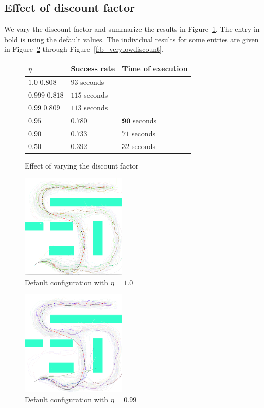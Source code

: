 \documentclass[a4paper]{article}
\begin{document}
\subsection{Effect of discount factor}
\label{s:discount}

We vary the discount factor and summarize the results in
Figure~\ref{f:discount}. The entry in bold is using the default values.
The individual results for some entries are given in
Figure~\ref{f:b_zerodiscount} through Figure~\ref{f:b_verylowdiscount}.

\begin{figure}
\caption{Effect of varying the discount factor}
\label{f:discount}
\begin{tabular}{ l | l | l }
  $\eta$ & Success rate & Time of execution \\ \hline \hline
  $1.0$ $0.808$ & $93$ seconds \\ \hline  %
  $0.999$ $0.818$ & $115$ seconds \\ \hline  %
  $0.99$ $0.809$ & $113$ seconds \\ \hline  %
  $\mathbf{0.95}$ & $\mathbf{0.780}$ & $\mathbf{90}$ seconds \\ \hline
  $0.90$ & $0.733$ & $71$ seconds \\ \hline  %
  $0.50$ & $0.392$ & $32$ seconds \\ \hline  %
\end{tabular}
\end{figure}

\begin{figure}
\caption{Default configuration with $\eta=1.0$}
\label{f:b_zerodiscount}
\centerline{\includegraphics[width=5cm]{b_zerodiscount.png}}
\end{figure}

\begin{figure}
\caption{Default configuration with $\eta=0.99$}
\centerline{\includegraphics[width=5cm]{b_hidiscount.png}}
\end{figure}
\end{document}
